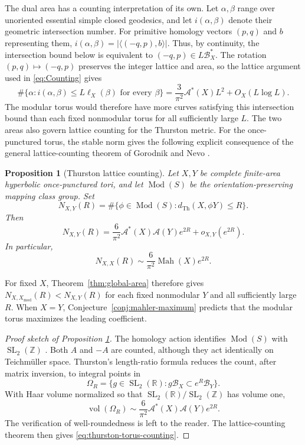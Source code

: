 \documentclass[10pt,twoside]{article}
\theoremstyle{plain}
\newtheorem{proposition}[theorem]{Proposition}
\theoremstyle{definition}
\theoremstyle{remark}
\newcommand{\A}{\mathcal A}
\newcommand{\B}{\mathcal B}
\newcommand{\R}{\mathbb R}
\newcommand{\Z}{\mathbb Z}
\newcommand{\Xmod}{X_{\mathrm{mod}}}
\begin{document}
The dual area has a counting interpretation of its own.
Let $\alpha,\beta$ range over unoriented essential simple closed
geodesics, and let $i(\alpha,\beta)$ denote their geometric
intersection number. For primitive homology vectors $(p,q)$
and $b$ representing them,
$i(\alpha,\beta)=|\langle(-q,p),b\rangle|$.
Thus, by continuity, the intersection bound below is equivalent
to $(-q,p)\in L\B_X^*$.
The rotation $(p,q)\mapsto(-q,p)$ preserves the integer lattice
and area, so the lattice argument used in \eqref{eq:Counting} gives
\begin{equation}\label{eq:ICounting}
    \#\{\alpha:i(\alpha,\beta)\leq L\ell_X(\beta)
          \text{ for every }\beta\}=\frac3{\pi^2}\A^*(X)L^2+O_X(L\log L).
\end{equation}
The modular torus would therefore have more curves satisfying this
intersection bound than each fixed nonmodular torus for all
sufficiently large $L$.
The two areas also govern lattice counting for the Thurston metric.
For the once-punctured torus, the stable norm gives the following
explicit consequence of the general lattice-counting theorem of
Gorodnik and Nevo \cite{GorodnikNevo}.

\begin{proposition}[Thurston lattice counting]\label{prop:thurston-counting}
Let $X,Y$ be complete finite-area hyperbolic once-punctured tori,
and let $\operatorname{Mod}(S)$ be the orientation-preserving
mapping class group. Set
$$
N_{X,Y}(R)=
\#\{\phi\in\operatorname{Mod}(S):
d_{\mathrm{Th}}(X,\phi Y)\leq R\}.
$$
Then
\begin{equation}\label{eq:thurston-torus-counting}
N_{X,Y}(R)=
\frac{6}{\pi^2}\A^*(X)\A(Y)e^{2R}
+o_{X,Y}(e^{2R}).
\end{equation}
In particular,
$$
N_{X,X}(R)\sim
\frac{6}{\pi^2}\operatorname{Mah}(X)e^{2R}.
$$
\end{proposition}
For fixed $X$, Theorem~\ref{thm:global-area} therefore gives
$N_{X,\Xmod}(R)<N_{X,Y}(R)$ for each fixed nonmodular $Y$
and all sufficiently large $R$.
When $X=Y$, Conjecture~\ref{conj:mahler-maximum} predicts that
the modular torus maximizes the leading coefficient.
\begin{proof}[Proof sketch of Proposition \ref{prop:thurston-counting}]
The homology action identifies $\operatorname{Mod}(S)$ with
$\operatorname{SL}_2(\Z)$ \cite{FarbMargalit}. Both $A$ and $-A$
are counted, although they act identically on Teichm\"uller space.
Thurston's length-ratio formula
\cite[Theorem~8.5]{ThurstonMinimalStretch} reduces the count,
after matrix inversion, to integral points in
$$
\Omega_R=\{g\in\operatorname{SL}_2(\R):
g\B_X\subset e^R\B_Y\}.
$$
With Haar volume normalized so that
$\operatorname{SL}_2(\R)/\operatorname{SL}_2(\Z)$ has volume one,
$$
\operatorname{vol}(\Omega_R)
\sim\frac6{\pi^2}\A^*(X)\A(Y)e^{2R}.
$$
The verification of well-roundedness
\cite[Definition~1.1]{GorodnikNevo} is left to the reader.
The lattice-counting theorem
\cite[Theorem~1.7 and Remark~4.6(ii)]{GorodnikNevo}
then gives \eqref{eq:thurston-torus-counting}.
\end{proof}
\end{document}
